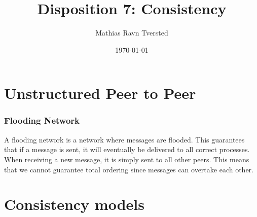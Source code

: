 
\newcommand{\N}{\mathbb{N}}

\title{Disposition 7: Consistency}   
\author{Mathias Ravn Tversted} 
\date{\today} 



\frame{\titlepage} 








\section{Unstructured Peer to Peer}
    \begin{frame}
        \frametitle{Flooding Network}
            A flooding network is a network where messages are flooded. This guarantees that if a message is sent, it will eventually be delivered to all correct processes. When receiving a new message, it is simply sent to all other peers. This means that we cannot guarantee total ordering since messages can overtake each other. 
    \end{frame}


\section{Consistency models}
